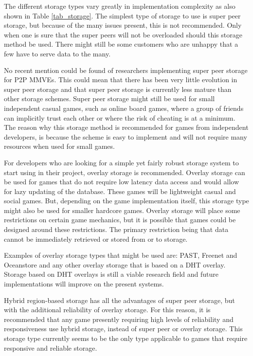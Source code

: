 The different storage types vary greatly in implementation complexity as also shown in Table \ref{tab_storage}. The simplest type of storage to use is super peer storage, but because of the many issues present, this is not recommended. Only when one is sure that the super peers will not be overloaded should this storage method be used. There might still be some customers who are unhappy that a few have to serve data to the many.

No recent mention could be found of researchers implementing super peer storage for P2P MMVEs. This could mean that there has been very little evolution in super peer storage and that super peer storage is currently less mature than other storage schemes. Super peer storage might still be used for small independent casual games, such as online board games, where a group of friends can implicitly trust each other or where the risk of cheating is at a minimum. The reason why this storage method is recommended for games from independent developers, is because the scheme is easy to
implement and will not require many resources when used for small games.

For developers who are looking for a simple yet fairly robust storage system to start using in their project, overlay storage is recommended. Overlay storage can be used for games that do not require low latency data access and would allow for lazy updating of the database. These games will be lightweight casual and social games. But, depending on the game implementation itself, this storage type might also be used for smaller hardcore games. Overlay storage will place some restrictions on certain game mechanics, but it is possible that games could be designed around these
restrictions. The primary restriction being that data cannot be immediately retrieved or stored from or to storage.

Examples of overlay storage types that might be used are: PAST, Freenet and Oceanstore and any other overlay storage that is based on a DHT overlay. Storage based on DHT overlays is still a viable research field and future implementations will improve on the present systems.

Hybrid region-based storage has all the advantages of super peer storage, but with the additional reliability of overlay storage. For this reason, it is recommended that any game presently requiring high levels of reliability and responsiveness use hybrid storage, instead of super peer or overlay storage. This storage type currently seems to be the only type applicable to games that require responsive and reliable storage.

